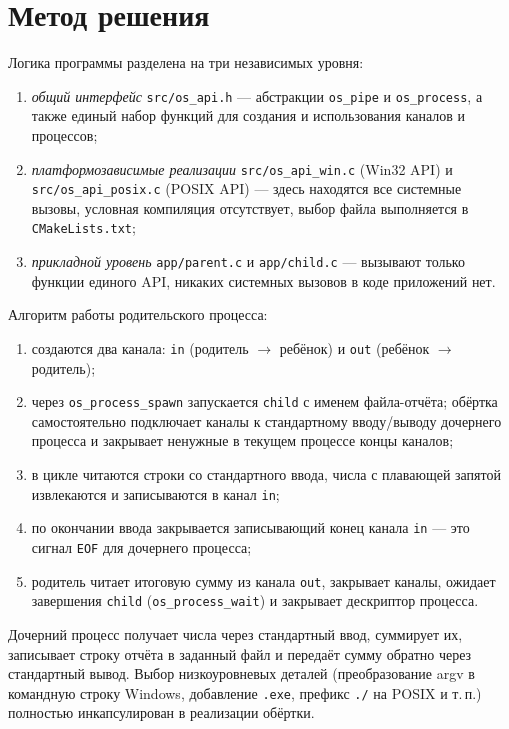 \section{Метод решения}

Логика программы разделена на три независимых уровня:
\begin{enumerate}
  \item \emph{общий интерфейс} \texttt{src/os\_api.h} --- абстракции \texttt{os\_pipe} и
    \texttt{os\_process}, а также единый набор функций для создания и использования каналов и
    процессов;
  \item \emph{платформозависимые реализации} \texttt{src/os\_api\_win.c} (Win32 API) и
    \texttt{src/os\_api\_posix.c} (POSIX API) --- здесь находятся все системные вызовы, условная
    компиляция отсутствует, выбор файла выполняется в \texttt{CMakeLists.txt};
  \item \emph{прикладной уровень} \texttt{app/parent.c} и \texttt{app/child.c} --- вызывают только
    функции единого API, никаких системных вызовов в коде приложений нет.
\end{enumerate}

Алгоритм работы родительского процесса:
\begin{enumerate}
  \item создаются два канала: \texttt{in} (родитель $\rightarrow$ ребёнок) и \texttt{out}
    (ребёнок $\rightarrow$ родитель);
  \item через \texttt{os\_process\_spawn} запускается \texttt{child} с именем файла-отчёта;
    обёртка самостоятельно подключает каналы к стандартному вводу/выводу дочернего процесса и
    закрывает ненужные в текущем процессе концы каналов;
  \item в цикле читаются строки со стандартного ввода, числа с плавающей запятой извлекаются и
    записываются в канал \texttt{in};
  \item по окончании ввода закрывается записывающий конец канала \texttt{in} --- это сигнал
    \texttt{EOF} для дочернего процесса;
  \item родитель читает итоговую сумму из канала \texttt{out}, закрывает каналы, ожидает
    завершения \texttt{child} (\texttt{os\_process\_wait}) и закрывает дескриптор процесса.
\end{enumerate}

Дочерний процесс получает числа через стандартный ввод, суммирует их, записывает строку отчёта в
заданный файл и передаёт сумму обратно через стандартный вывод. Выбор низкоуровневых деталей
(преобразование argv в командную строку Windows, добавление \texttt{.exe}, префикс \texttt{./}
на POSIX и т.\,п.) полностью инкапсулирован в реализации обёртки.


